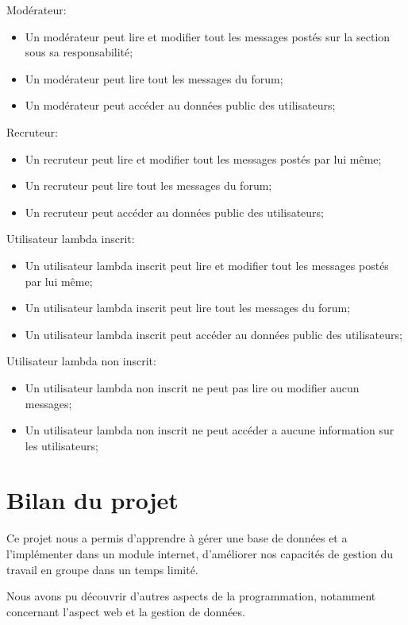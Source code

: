 \documentclass{report}
\begin{document}
Modérateur:
\begin{itemize}
	\item Un modérateur peut lire et modifier tout les messages postés sur la section sous sa responsabilité;
  \item Un modérateur peut lire tout les messages du forum;
	\item Un modérateur peut accéder au données public des utilisateurs;\\
\end{itemize}


Recruteur:
\begin{itemize}
  \item Un recruteur peut lire et modifier tout les messages postés par lui même;
  \item Un recruteur peut lire tout les messages du forum;
  \item Un recruteur peut accéder au données public des utilisateurs;\\
\end{itemize}



Utilisateur lambda inscrit:
\begin{itemize}
  \item Un utilisateur lambda inscrit peut lire et modifier tout les messages postés par lui même;
  \item Un utilisateur lambda inscrit peut lire tout les messages du forum;
  \item Un utilisateur lambda inscrit peut accéder au données public des utilisateurs;\\
\end{itemize}


Utilisateur lambda non inscrit:
\begin{itemize}
  \item Un utilisateur lambda non inscrit ne peut pas lire ou modifier aucun messages;
  \item Un utilisateur lambda non inscrit ne peut accéder a aucune information sur les utilisateurs;\\
\end{itemize}

\chapter{Bilan du projet}
Ce projet nous a permis d'apprendre à gérer une base de données et a l'implémenter dans un module internet, d'améliorer nos capacités de gestion du travail en groupe dans un temps limité.\par 
Nous avons pu découvrir d'autres aspects de la programmation, notamment concernant l'aspect web et la gestion de données. 
\end{document}
